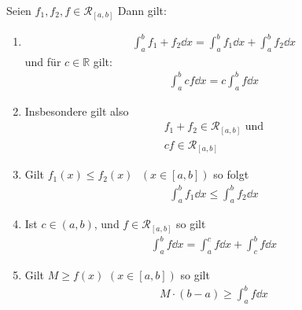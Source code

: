 \begin{Satz}{\label{vl_11_satz24}%
	Seien $f_1, f_2,f \in \mathcal{R}_{[a,b]}$ Dann gilt:
	\begin{enumerate}
		\item 
		\begin{align*}
			\int_a^b f_1 +f_2 \dd{x} = \int_a^b f_1\dd{x} + \int_a^b f_2 \dd{x}
		\end{align*}
		und für $c \in \mathbb{R}$ gilt:
		\begin{align*}
			\int_a^b c f\dd{x} = c \int_a^b f\dd{x}
		\end{align*}
		\item Insbesondere gilt also 
		\begin{align*}
			f_1 + f_2 \in \mathcal{R}_{[a,b]} \text{ und} \\
			c f \in \mathcal{R}_{[a,b]}
		\end{align*}
		\item Gilt $f_1(x) \leq f_2(x) \text{ } ( x \in [a,b])$ so folgt
		\begin{align*}			
			\int_a^b f_1 \dd{x} \leq \int_a^b f_2 \dd{x}
		\end{align*}
		\item Ist $c \in (a,b)$, und $f \in \mathcal{R}_{[a,b]}$ so gilt
		\begin{align*}
			\int_a^b f\dd{x} = \int_a^c f\dd{x} + \int_c^b f \dd{x}
		\end{align*}
		\item Gilt $M \geq f(x)$ $(x \in [a,b])$ so gilt 
		\begin{align*}
			M \cdot (b-a) \geq \int_a^b f \dd{x}
		\end{align*}
	\end{enumerate}
}\end{Satz}

